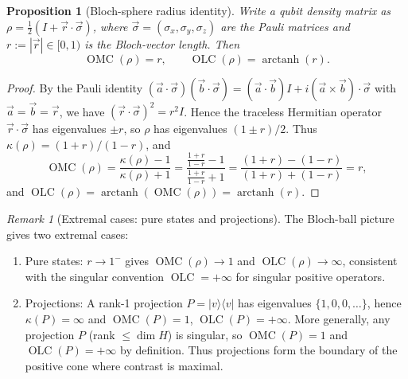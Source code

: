 \documentclass{article}
\newtheorem{proposition}[theorem]{Proposition}
\theoremstyle{remark}
\newtheorem{remark}[theorem]{Remark}
\providecommand{\QLC}{\operatorname{OLC}}
\providecommand{\QMC}{\operatorname{OMC}}
\begin{document}
\begin{proposition}[Bloch-sphere radius identity]\label{prop:bloch}
Write a qubit density matrix as $\rho=\tfrac12(I+\vec r\cdot\vec\sigma)$, where $\vec\sigma=(\sigma_x,\sigma_y,\sigma_z)$ are the Pauli matrices and $r:=|\vec r|\in[0,1)$ is the Bloch-vector length. Then
\[
\QMC(\rho) = r, \qquad \QLC(\rho)=\operatorname{arctanh}(r).
\]
\end{proposition}
\begin{proof}
By the Pauli identity $(\vec a\cdot\vec\sigma)(\vec b\cdot\vec\sigma)=(\vec a\cdot\vec b)I+i(\vec a\times\vec b)\cdot\vec\sigma$ with $\vec a=\vec b=\vec r$, we have $(\vec r\cdot\vec\sigma)^2=r^2I$. Hence the traceless Hermitian operator $\vec r\cdot\vec\sigma$ has eigenvalues $\pm r$, so $\rho$ has eigenvalues $(1\pm r)/2$. Thus $\kappa(\rho)=(1+r)/(1-r)$, and
\[
\QMC(\rho) = \frac{\kappa(\rho)-1}{\kappa(\rho)+1} = \frac{\frac{1+r}{1-r}-1}{\frac{1+r}{1-r}+1} = \frac{(1+r)-(1-r)}{(1+r)+(1-r)} = r,
\]
and $\QLC(\rho)=\operatorname{arctanh}(\QMC(\rho))=\operatorname{arctanh}(r)$.
\end{proof}

\begin{remark}[Extremal cases: pure states and projections]
The Bloch-ball picture gives two extremal cases:
\begin{enumerate}
\item Pure states: $r\to1^-$ gives $\QMC(\rho)\to1$ and $\QLC(\rho)\to\infty$, consistent with the singular convention $\QLC=+\infty$ for singular positive operators.
\item Projections: A rank-1 projection $P=|v\rangle\langle v|$ has eigenvalues $\{1,0,0,\ldots\}$, hence $\kappa(P)=\infty$ and $\QMC(P)=1$, $\QLC(P)=+\infty$. More generally, any projection $P$ (rank $\le\dim H$) is singular, so $\QMC(P)=1$ and $\QLC(P)=+\infty$ by definition. Thus projections form the boundary of the positive cone where contrast is maximal.
\end{enumerate}
\end{remark}
\end{document}
